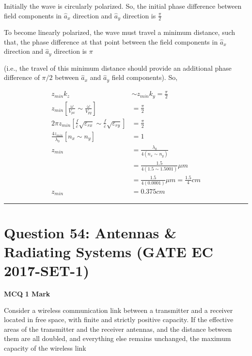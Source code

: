 \documentclass[11pt,a4paper]{article}
\begin{document}
\begin{tcolorbox}[solbox, title=Detailed Solution -- Question 53]
Initially the wave is circularly polarized. So, the
initial phase difference between field components
in $\hat{a}_{x}$ direction and $\hat{a}_{y}$ direction is $\frac{\pi}{2}$

To become linearly polarized, the wave must travel
a minimum distance, such that, the phase
difference at that point between the field
components in $\hat{a}_{x}$ direction and $\hat{a}_{y}$ direction is $\pi$

(i.e., the travel of this minimum distance should
provide an additional phase difference of $\pi / 2$
between $\hat{a}_{x}$ and $\hat{a}_{y}$ field components).
So,

\[
\begin{aligned} z_{min}k_z&\sim z_{min}k_y=\frac{\pi}{2} \\ z_{min}\left [ \frac{\omega }{V_{px}}\sim \frac{\omega }{V_{py}} \right ]&= \frac{\pi}{2} \\ 2 \pi z_{min}\left [ \frac{f}{c}\sqrt{\varepsilon _{rx}}\sim \frac{f}{c}\sqrt{\varepsilon _{ry}}\right ]&=\frac{\pi}{2} \\ \frac{4 z_{min}}{\lambda _0}[n_x\sim n_y]&=1 \\ z_{min}&=\frac{\lambda _0}{4(n_x\sim n_y)} \\ &=\frac{1.5}{4(1.5\sim 1.5001)}\mu m \\ &= \frac{1.5}{4(0.0001)}\mu m=\frac{1.5}{4}cm\\ z_{min}&=0.375cm \end{aligned}
\]
\end{tcolorbox}

\vspace{1.5em}
\hrule
\vspace{1.5em}

\section*{Question 54: Antennas \& Radiating Systems (GATE EC 2017-SET-1)}
\noindent \textbf{\color{primary}MCQ} \hfill \textbf{\color{secondary}1 Mark}


\noindent Consider a wireless communication link between a transmitter and a receiver located in free space, with finite and strictly positive capacity. If the effective areas of the transmitter and the receiver antennas, and the distance between them are all doubled, and everything else remains
unchanged, the maximum capacity of the wireless link
\end{document}
